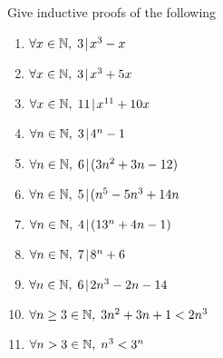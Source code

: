 
Give inductive proofs of the following 
\begin{enumerate}
\item $\forall x \in {\mathbb N}, \; 3 \!\mid\! x^3-x$

\wbvfill


\item $\forall x \in {\mathbb N}, \; 3 \!\mid\! x^3+5x$

\wbvfill

\workbookpagebreak

\item $\forall x \in {\mathbb N}, \; 11 \!\mid\! x^{11}+10x$

\wbvfill


\item $\forall n \in {\mathbb N}, \; 3 \!\mid\! 4^n-1$

\wbvfill

\workbookpagebreak

\item $\forall n \in {\mathbb N}, \; 6 \!\mid\! (3n^{2}+3n-12)$

\wbvfill


\item $\forall n \in {\mathbb N}, \; 5 \!\mid\! (n^{5}-5n^{3}+14n$

\wbvfill

\workbookpagebreak

\item $\forall n \in {\mathbb N}, \; 4 \!\mid\! (13^{n}+4n-1)$

\wbvfill


\item $\forall n \in {\mathbb N}, \; 7 \!\mid\! 8^n+6$

\wbvfill

\workbookpagebreak

\item $\forall n \in {\mathbb N}, \; 6 \!\mid\! 2n^3 - 2n - 14$

\wbvfill


\item $\forall n \geq 3 \in {\mathbb N}, \; 3n^2+3n+1 < 2n^3$

\wbvfill

\workbookpagebreak

\item $\forall n > 3 \in {\mathbb N}, \; n^3 < 3^n$


\end{enumerate}

